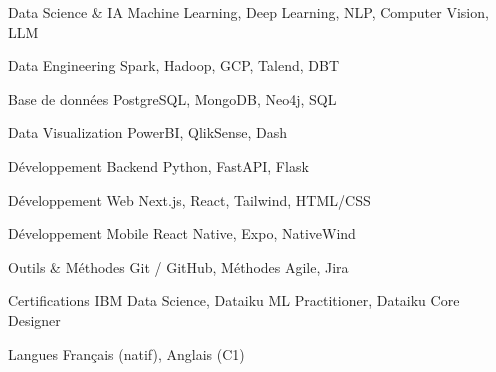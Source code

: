 


\begin{cvskills}


\cvskill
{Data Science \& IA} %
{Machine Learning, Deep Learning, NLP, Computer Vision, LLM} %


\cvskill
{Data Engineering} %
{Spark, Hadoop, GCP, Talend, DBT} %


\cvskill
{Base de données} %
{PostgreSQL, MongoDB, Neo4j, SQL} %


\cvskill
{Data Visualization} %
{PowerBI, QlikSense, Dash} %


\cvskill
{Développement Backend} %
{Python, FastAPI, Flask} %


\cvskill
{Développement Web} %
{Next.js, React, Tailwind, HTML/CSS} %


\cvskill
{Développement Mobile} %
{React Native, Expo, NativeWind} %


\cvskill
{Outils \& Méthodes} %
{Git / GitHub, Méthodes Agile, Jira} %


\cvskill
{Certifications} %
{IBM Data Science, Dataiku ML Practitioner, Dataiku Core Designer} %


\cvskill
{Langues} %
{Français (natif), Anglais (C1)} %


\end{cvskills}